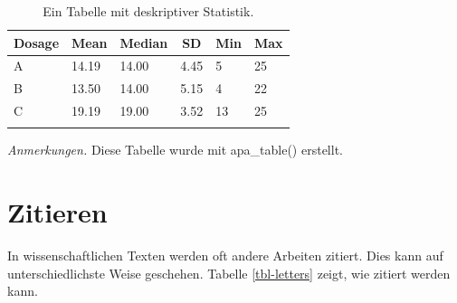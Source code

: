 \documentclass[
  doc]{apa7}
\begin{document}
\begin{table}[tbp]

\begin{center}
\begin{threeparttable}

\caption{\label{tab:mixedtab}Ein Tabelle mit deskriptiver Statistik.}

\begin{tabular}{llllll}
\toprule
Dosage & \multicolumn{1}{c}{Mean} & \multicolumn{1}{c}{Median} & \multicolumn{1}{c}{SD} & \multicolumn{1}{c}{Min} & \multicolumn{1}{c}{Max}\\
\midrule
A & 14.19 & 14.00 & 4.45 & 5 & 25\\
B & 13.50 & 14.00 & 5.15 & 4 & 22\\
C & 19.19 & 19.00 & 3.52 & 13 & 25\\
\bottomrule
\addlinespace
\end{tabular}

\begin{tablenotes}[para]
\normalsize{\textit{Anmerkungen.} Diese Tabelle wurde mit apa\_table() erstellt.}
\end{tablenotes}

\end{threeparttable}
\end{center}

\end{table}

\hypertarget{zitieren}{%
\section{Zitieren}\label{zitieren}}

In wissenschaftlichen Texten werden oft andere Arbeiten zitiert. Dies kann auf unterschiedlichste Weise geschehen. Tabelle \ref{tbl-letters} zeigt, wie zitiert werden kann.
\end{document}

